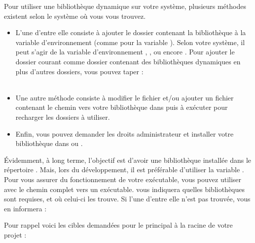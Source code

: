 \bigskip

Pour utiliser une bibliothèque dynamique sur votre système, plusieurs méthodes existent selon le système où vous vous trouvez.\\

\begin{itemize}
\item L'une d'entre elle consiste à ajouter le dossier contenant la bibliothèque à la variable d'environnement  (comme pour la variable ).
Selon votre système, il peut s'agir de la variable d'environnement , , ou encore .
Pour ajouter le dossier courant comme dossier contenant des bibliothèques dynamiques en plus d'autres dossiers, vous pouvez taper :\\
\\

\item Une autre méthode consiste à modifier le fichier  et/ou ajouter un fichier contenant le chemin vers votre bibliothèque dans  puis à exécuter  pour recharger les dossiers à utiliser.\\

\item Enfin, vous pouvez demander les droits administrateur et installer votre bibliothèque dans  ou .\\
\end{itemize}

\bigskip

\noindent \'Evidemment, à long terme, l'objectif est d'avoir une bibliothèque installée dans le répertoire .
Mais, lors du développement, il est préférable d'utiliser la variable .
Pour vous assurer du fonctionnement de votre exécutable, vous pouvez utiliser  avec le chemin complet vers un exécutable.
 vous indiquera quelles bibliothèques sont requises, et où celui-ci les trouve.
Si l'une d'entre elle n'est pas trouvée,  vous en informera :\\




\bigskip

Pour rappel voici les cibles demandées pour le  principal à la racine de votre projet :

